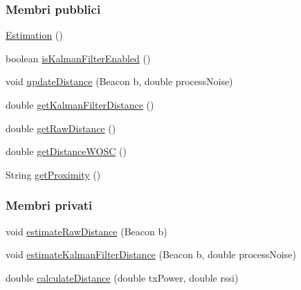 \subsubsection*{Membri pubblici}
\begin{DoxyCompactItemize}
\item 
\hyperlink{classit_1_1unibo_1_1torsello_1_1bluetoothpositioning_1_1distanceEstimation_1_1Estimation_abd84ded1e26d40304606ce0572735106_abd84ded1e26d40304606ce0572735106}{Estimation} ()
\item 
boolean \hyperlink{classit_1_1unibo_1_1torsello_1_1bluetoothpositioning_1_1distanceEstimation_1_1Estimation_a0863741935c878f7fa6f8c7c6cc086c9_a0863741935c878f7fa6f8c7c6cc086c9}{is\+Kalman\+Filter\+Enabled} ()
\item 
void \hyperlink{classit_1_1unibo_1_1torsello_1_1bluetoothpositioning_1_1distanceEstimation_1_1Estimation_aaf86439861db7facf3f5338ec2fc6cde_aaf86439861db7facf3f5338ec2fc6cde}{update\+Distance} (Beacon b, double process\+Noise)
\item 
double \hyperlink{classit_1_1unibo_1_1torsello_1_1bluetoothpositioning_1_1distanceEstimation_1_1Estimation_a985e9b8b61c3d1e917a2e818b5f8b679_a985e9b8b61c3d1e917a2e818b5f8b679}{get\+Kalman\+Filter\+Distance} ()
\item 
double \hyperlink{classit_1_1unibo_1_1torsello_1_1bluetoothpositioning_1_1distanceEstimation_1_1Estimation_ad355b2e850a8d6013ef771eecd740e1b_ad355b2e850a8d6013ef771eecd740e1b}{get\+Raw\+Distance} ()
\item 
double \hyperlink{classit_1_1unibo_1_1torsello_1_1bluetoothpositioning_1_1distanceEstimation_1_1Estimation_a5c7bce21cd77c98a8d1e6df4c930397c_a5c7bce21cd77c98a8d1e6df4c930397c}{get\+Distance\+W\+O\+SC} ()
\item 
String \hyperlink{classit_1_1unibo_1_1torsello_1_1bluetoothpositioning_1_1distanceEstimation_1_1Estimation_a2edfb9f301730647277474c61b41dbd5_a2edfb9f301730647277474c61b41dbd5}{get\+Proximity} ()
\end{DoxyCompactItemize}
\subsubsection*{Membri privati}
\begin{DoxyCompactItemize}
\item 
void \hyperlink{classit_1_1unibo_1_1torsello_1_1bluetoothpositioning_1_1distanceEstimation_1_1Estimation_a0cc72ed8871490402b1fac0a10520f7d_a0cc72ed8871490402b1fac0a10520f7d}{estimate\+Raw\+Distance} (Beacon b)
\item 
void \hyperlink{classit_1_1unibo_1_1torsello_1_1bluetoothpositioning_1_1distanceEstimation_1_1Estimation_ac3451825d5672d5e761269afc563e88e_ac3451825d5672d5e761269afc563e88e}{estimate\+Kalman\+Filter\+Distance} (Beacon b, double process\+Noise)
\item 
double \hyperlink{classit_1_1unibo_1_1torsello_1_1bluetoothpositioning_1_1distanceEstimation_1_1Estimation_a6e33d4e0b776517a86c6aa87cd51b66b_a6e33d4e0b776517a86c6aa87cd51b66b}{calculate\+Distance} (double tx\+Power, double rssi)
\end{DoxyCompactItemize}
